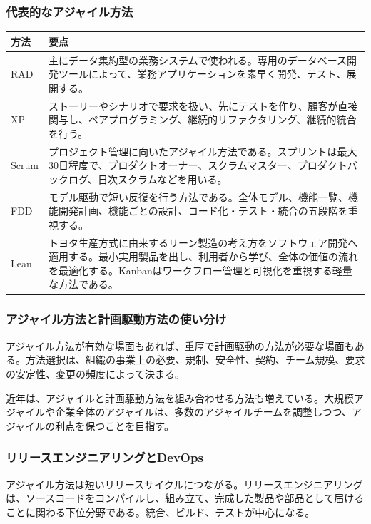 \documentclass[a4paper,11pt]{ltjsarticle}
\begin{document}
\subsubsection{代表的なアジャイル方法}
\begin{longtable}{>{\raggedright\arraybackslash}p{}>{\raggedright\arraybackslash}p{}}
\toprule
\textbf{方法} & \textbf{要点} \\
\midrule
RAD & 主にデータ集約型の業務システムで使われる。専用のデータベース開発ツールによって、業務アプリケーションを素早く開発、テスト、展開する。\\
XP & ストーリーやシナリオで要求を扱い、先にテストを作り、顧客が直接関与し、ペアプログラミング、継続的リファクタリング、継続的統合を行う。\\
Scrum & プロジェクト管理に向いたアジャイル方法である。スプリントは最大30日程度で、プロダクトオーナー、スクラムマスター、プロダクトバックログ、日次スクラムなどを用いる。\\
FDD & モデル駆動で短い反復を行う方法である。全体モデル、機能一覧、機能開発計画、機能ごとの設計、コード化・テスト・統合の五段階を重視する。\\
Lean & トヨタ生産方式に由来するリーン製造の考え方をソフトウェア開発へ適用する。最小実用製品を出し、利用者から学び、全体の価値の流れを最適化する。Kanbanはワークフロー管理と可視化を重視する軽量な方法である。\\
\bottomrule
\end{longtable}

\subsubsection{アジャイル方法と計画駆動方法の使い分け}
アジャイル方法が有効な場面もあれば、重厚で計画駆動の方法が必要な場面もある。方法選択は、組織の事業上の必要、規制、安全性、契約、チーム規模、要求の安定性、変更の頻度によって決まる。

近年は、アジャイルと計画駆動方法を組み合わせる方法も増えている。大規模アジャイルや企業全体のアジャイルは、多数のアジャイルチームを調整しつつ、アジャイルの利点を保つことを目指す。

\subsubsection{リリースエンジニアリングとDevOps}
アジャイル方法は短いリリースサイクルにつながる。リリースエンジニアリングは、ソースコードをコンパイルし、組み立て、完成した製品や部品として届けることに関わる下位分野である。統合、ビルド、テストが中心になる。
\end{document}
